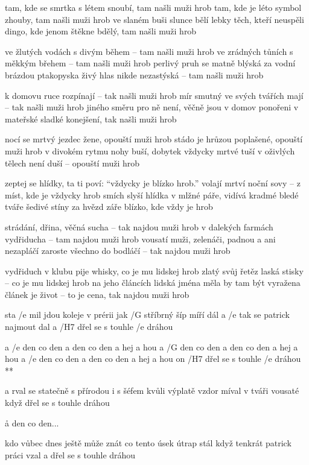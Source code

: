 tam, kde se smrtka s létem snoubí, tam našli muži hrob
tam, kde je léto symbol zhouby, tam našli muži hrob
ve slaném buši slunce bělí lebky těch, kteří neuspěli
dingo, kde jenom štěkne bdělý, tam našli muži hrob \s

ve žlutých vodách s divým během -- tam našli muži hrob
ve zrádných tůních s měkkým břehem -- tam našli muži hrob
perlivý pruh se matně blýská za vodní brázdou ptakopyska
živý hlas nikde nezastýská -- tam našli muži hrob \s

k domovu ruce rozpínají -- tak našli muži hrob
mír smutný ve svých tvářích mají -- tak našli muži hrob
jiného směru pro ně není, věčně jsou v domov ponořeni
v mateřské sladké konejšení, tak našli muži hrob \s

nocí se mrtvý jezdec žene, opouští muži hrob
stádo je hrůzou poplašené, opouští muži hrob
v divokém rytmu nohy buší, dobytek vždycky mrtvé tuší
v oživlých tělech není duší -- opouští muži hrob \s

zeptej se hlídky, ta ti poví: ``vždycky je blízko hrob.''
volají mrtví noční sovy -- z míst, kde je vždycky hrob
smích slyší hlídka v mlžné páře, vidívá kradmé bledé tváře
šedivé stíny za hvězd záře blízko, kde vždy je hrob \s

strádání, dřina, věčná sucha -- tak najdou muži hrob
v dalekých farmách vydřiducha -- tam najdou muži hrob
vousatí muži, zelenáči, padnou a ani nezapláčí
zaroste všechno do bodláčí -- tak najdou muži hrob \s

vydřiduch v klubu pije whisky, co je mu lidskej hrob
zlatý svůj řetěz laská stisky -- co je mu lidskej hrob
na jeho článcích lidská jména měla by tam být vyražena
článek je život -- to je cena, tak najdou muži hrob \s




sta /e mil jdou koleje v prérii
jak /G stříbrný šíp míří dál
a /e tak se patrick najmout dal
a /H7 dřel se s touhle /e dráhou

\R a /e den co den a den co den a hej a hou
   a /G den co den a den co den a hej a hou
   a /e den co den a den co den a hej a hou
   on /H7 dřel se s touhle /e dráhou **

a rval se statečně s přírodou
i s šéfem kvůli výplatě
vzdor míval v tváři vousaté
když dřel se s touhle dráhou

\r a den co den...

kdo vůbec dnes ještě může znát
co tento úsek útrap stál
když tenkrát patrick práci vzal
a dřel se s touhle dráhou \s

